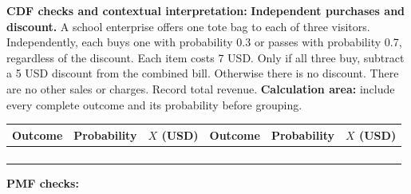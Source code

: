 \par%
\noindent%
\begin{minipage}[t]{.37\linewidth}%
  \vspace{0pt}\centering
\end{minipage}%
\hfill%
\begin{minipage}[t]{.60\linewidth}%
  \vspace{0pt}\centering
\end{minipage}%
\par
\textbf{CDF checks and contextual interpretation:}
\vfill
\clearpage
{}
\textbf{Independent purchases and discount.} A school enterprise offers one tote bag to each of three
visitors. Independently, each buys one with probability 0.3 or passes with probability 0.7, regardless of the
discount. Each item costs 7 USD. Only if all three buy, subtract a 5 USD discount from the combined bill.
Otherwise there is no discount. There are no other sales or charges. Record total revenue.
\textbf{Calculation area:} include every complete outcome and its probability before grouping.
\par%
\noindent%
\begin{tabularx}{\linewidth}{|Y|Y|Y|Y|Y|Y|}%
  \hline Outcome & Probability & $X$ (USD) & Outcome & Probability & $X$ (USD)\\%
  \hline
  \rule{0pt}{.63cm}& & & & & \\%
  \hline
  \rule{0pt}{.63cm}& & & & & \\%
  \hline
  \rule{0pt}{.63cm}& & & & & \\%
  \hline
  \rule{0pt}{.63cm}& & & & & \\%
  \hline
\end{tabularx}
\par%
\noindent%
\begin{minipage}[t]{.37\linewidth}%
  \vspace{0pt}\centering
\end{minipage}%
\hfill%
\begin{minipage}[t]{.60\linewidth}%
  \vspace{0pt}\centering
\end{minipage}%
\par
\textbf{PMF checks:} \hrulefill%
